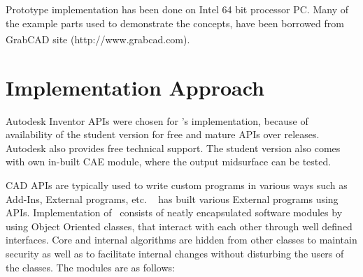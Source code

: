 Prototype implementation has been done on Intel 64 bit processor PC.  Many of the example parts used to demonstrate the concepts, have been borrowed from GrabCAD\textsuperscript{\textregistered} site (http://www.grabcad.com).

\section{Implementation Approach} \label{sec:proposal:implementation}
Autodesk Inventor APIs were chosen for \mysystemname's implementation, because of availability of the student version for free and mature APIs over releases.  Autodesk also provides free technical support. The student version also comes with own in-built CAE module, where the output midsurface can be tested.

CAD APIs are typically used to write custom programs in various ways such as Add-Ins, External programs, etc. \mysystemname~ has built various External programs using APIs.
Implementation of \mysystemname~consists of neatly encapsulated software modules by using Object Oriented classes, that interact with each other through well defined interfaces. Core and internal algorithms are hidden from other classes to maintain security as well as to facilitate internal changes without disturbing the users of the classes. The modules are as follows:

